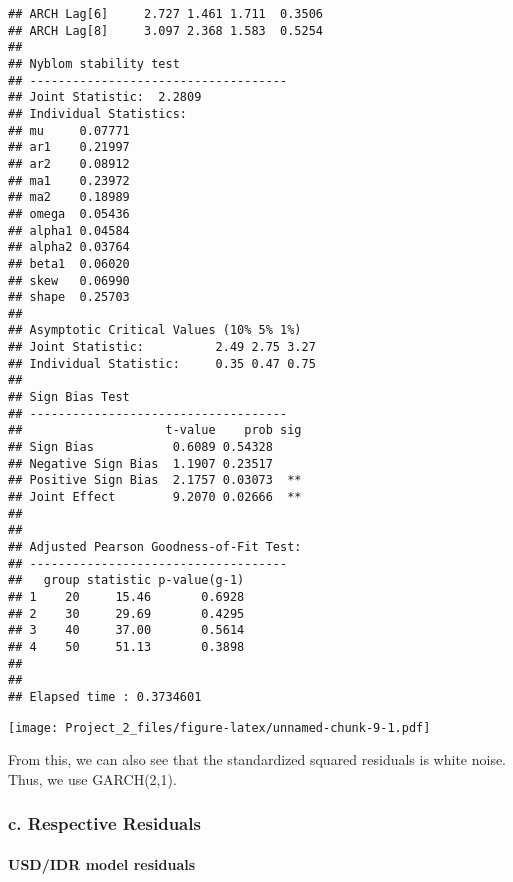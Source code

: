 \documentclass[]{article}
\newenvironment{Shaded}{\begin{snugshade}}{\end{snugshade}}
\newcommand{\KeywordTok}[1]{\textcolor[rgb]{0.13,0.29,0.53}{\textbf{#1}}}
\newcommand{\DataTypeTok}[1]{\textcolor[rgb]{0.13,0.29,0.53}{#1}}
\newcommand{\StringTok}[1]{\textcolor[rgb]{0.31,0.60,0.02}{#1}}
\newcommand{\CommentTok}[1]{\textcolor[rgb]{0.56,0.35,0.01}{\textit{#1}}}
\newcommand{\OperatorTok}[1]{\textcolor[rgb]{0.81,0.36,0.00}{\textbf{#1}}}
\newcommand{\NormalTok}[1]{#1}
\let\oldparagraph\paragraph
\renewcommand{\paragraph}[1]{\oldparagraph{#1}\mbox{}}
\begin{document}
\begin{verbatim}
## ARCH Lag[6]     2.727 1.461 1.711  0.3506
## ARCH Lag[8]     3.097 2.368 1.583  0.5254
## 
## Nyblom stability test
## ------------------------------------
## Joint Statistic:  2.2809
## Individual Statistics:              
## mu     0.07771
## ar1    0.21997
## ar2    0.08912
## ma1    0.23972
## ma2    0.18989
## omega  0.05436
## alpha1 0.04584
## alpha2 0.03764
## beta1  0.06020
## skew   0.06990
## shape  0.25703
## 
## Asymptotic Critical Values (10% 5% 1%)
## Joint Statistic:          2.49 2.75 3.27
## Individual Statistic:     0.35 0.47 0.75
## 
## Sign Bias Test
## ------------------------------------
##                    t-value    prob sig
## Sign Bias           0.6089 0.54328    
## Negative Sign Bias  1.1907 0.23517    
## Positive Sign Bias  2.1757 0.03073  **
## Joint Effect        9.2070 0.02666  **
## 
## 
## Adjusted Pearson Goodness-of-Fit Test:
## ------------------------------------
##   group statistic p-value(g-1)
## 1    20     15.46       0.6928
## 2    30     29.69       0.4295
## 3    40     37.00       0.5614
## 4    50     51.13       0.3898
## 
## 
## Elapsed time : 0.3734601
\end{verbatim}

\begin{Shaded}
\end{Shaded}

\texttt{[image: Project\_2\_files/figure-latex/unnamed-chunk-9-1.pdf]}

From this, we can also see that the standardized squared residuals is
white noise. Thus, we use GARCH(2,1).

\subsubsection{c. Respective Residuals}\label{c.-respective-residuals}

\paragraph{USD/IDR model residuals}\label{usdidr-model-residuals}
\end{document}
